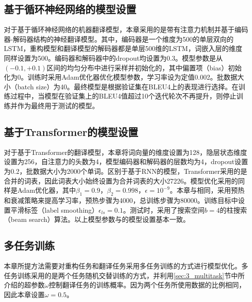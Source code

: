 \subsection{基于循环神经网络的模型设置}
\label{sec:3_rnn_setup}
对于基于循环神经网络的机器翻译模型，本章采用的是带有注意力机制并基于编码器-解码器结构的神经翻译模型。其中，编码器是一个维度为500的单层双向的LSTM，重构模型和翻译模型的解码器都是单层500维的LSTM，词嵌入层的维度同样设置为500。编码器和解码器中的dropout均设置为0.3。模型参数是从$(-0.1,+0.1)$区间的均匀分布中进行采样并初始化的，其中偏置项（bias）初始化为0。训练时采用Adam优化器优化模型参数，学习率设为定值0.002。批数据大小（batch size）为40。最终模型是根据验证集在BLEU4上的表现进行选择。在训练过程中，当模型在验证集上的BLEU4值超过10个迭代轮次不再提升，则停止训练并作为最终用于测试的模型。

\subsection{基于Transformer的模型设置}
\label{sec:3_transformer_setup}
对于基于Transformer的翻译模型，本章将词向量的维度设置为128，隐层状态维度设置为256，自注意力的头数为4，模型编码器和解码器的层数均为4，dropout设置为0.2，批数据大小为2000个单词。区别于基于RNN的模型，Transformer采用的是合并的词表，因此词表大小始终设置为合并词表的大小27226。模型优化采用的同样是Adam优化器，其中$\beta_1=0.9$，$\beta_2=0.998$，$\epsilon=10^{-9}$。本章与相同，采用预热和衰减策略来提高学习率，预热步骤为4000，总训练步骤为80000。训练目标中设置平滑标签（label smoothing）$\epsilon_{ls}=0.1$。测试时，采用了搜索空间$b=4$的柱搜索（beam search）算法。以上模型参数与的模型设置基本一致。

\subsection{多任务训练}
本章所提方法需要对重构任务和翻译任务采用多任务训练的方式进行模型优化。多任务训练采用的是两个任务随机交替训练的方式，并利用\ref{sec:3_multitask}节中所介绍的超参数$\omega$控制翻译任务的训练概率。因为两个任务所使用数据的比例相同，因此本章设置$\omega=0.5$。

